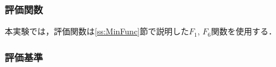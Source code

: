 \documentclass[a4j,11pt]{jarticle}
\begin{document}
\subsubsection{評価関数}
\label{sss:DNRBA-func}
本実験では，評価関数は\ref{ss:MinFunc}節で説明した$F_1$, $F_6$関数を使用する．









\subsubsection{評価基準}
\label{sss:DNRBA-eval}
\end{document}
